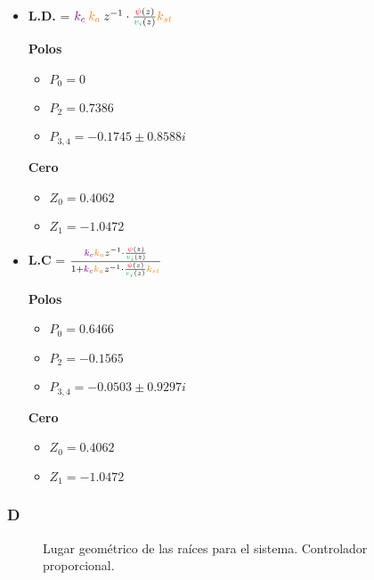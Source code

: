  \begin{itemize}
  \item \textbf{L.D.} = \( \mora{k_{c}} \nara{ k_{a}} z^{-1} \cdot \frac{\rojo{\psi}(z)}{\verd{v_i}(z)} \nara{k_{st}} \) 
  
  \begin{multicols}{2}
    \textbf{Polos}
    \begin{itemize}
      \item \(P_{0} = 0 \)
      \item \(P_{2} = 0.7386\)
      \item \(P_{3,4} = -0.1745 \pm 0.8588i\) 
    \end{itemize}
    \columnbreak
    \textbf{Cero}
    \begin{itemize}
        \item \(Z_0 = 0.4062\)
        \item \(Z_1 = -1.0472\)
    \end{itemize}
  \end{multicols}

  \item \textbf{L.C} =  \(\frac{  \mora{k_{c}} \nara{ k_{a}} z^{-1} \cdot \frac{\rojo{\psi}(z)}{\verd{v_i}(z)}} {1+ \mora{k_{c}} \nara{ k_{a}} z^{-1} \cdot \frac{\rojo{\psi}(z)}{\verd{v_i}(z)} \nara{k_{st}} }  \)
  
  \begin{multicols}{2}
    \textbf{Polos}
    \begin{itemize}
      \item \(P_{0} = 0.6466 \)
      \item \(P_{2} = -0.1565\)
      \item \(P_{3,4} = -0.0503 \pm 0.9297i\) 
    \end{itemize}
    \columnbreak
    \textbf{Cero}
    \begin{itemize}
        \item \(Z_0 = 0.4062\)
        \item \(Z_1 = -1.0472\)
    \end{itemize}
  \end{multicols}
 \end{itemize}



\FloatBarrier
\subsubsection{D}%

\begin{figure}[ht]
    \centering
    
    \caption{Lugar geométrico de las raíces para el sistema. Controlador proporcional.}
    \label{fig:lgr-i}
  \end{figure}

